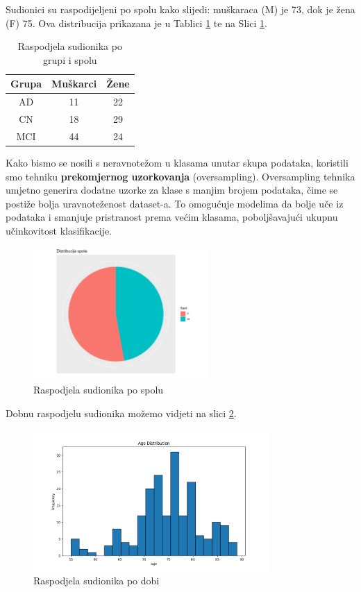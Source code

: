 \documentclass[zavrsnirad,upload]{fer}
\begin{document}
Sudionici su raspodijeljeni po spolu kako slijedi: muškaraca (M) je 73, dok je žena (F) 75. Ova distribucija prikazana je u Tablici \ref{tab:raspodjelaspol} te na Slici \ref{fig:spol}.

\begin{table}[ht]
	\centering
	\begin{tabular}{|c|c|c|}
		\hline
		\textbf{Grupa} & \textbf{Muškarci} & \textbf{Žene} \\
		\hline
		AD & 11 & 22 \\
		CN & 18 & 29 \\
		MCI & 44 & 24 \\
		\hline
	\end{tabular}
	\caption{Raspodjela sudionika po grupi i spolu}
	\label{tab:raspodjelaspol}
\end{table}

Kako bismo se nosili s neravnotežom u klasama unutar skupa podataka, koristili smo tehniku \textbf{prekomjernog uzorkovanja }(oversampling). Oversampling tehnika umjetno generira dodatne uzorke za klase s manjim brojem podataka, čime se postiže bolja uravnoteženost dataset-a. To omogućuje modelima da bolje uče iz podataka i smanjuje pristranost prema većim klasama, poboljšavajući ukupnu učinkovitost klasifikacije. 

\begin{figure}[h]
	\centering
	\includegraphics[width=0.6\textwidth]{Figures/pie_chart_spola.png}
	\caption{Raspodjela sudionika po spolu}
	\label{fig:spol}
\end{figure}

Dobnu raspodjelu sudionika možemo vidjeti na slici \ref{fig:dob}.
\begin{figure}[h]
	\centering
	\includegraphics[width=0.8\textwidth]{Figures/histogram_dobi.png}
	\caption{Raspodjela sudionika po dobi}
	\label{fig:dob}
\end{figure}
\end{document}
